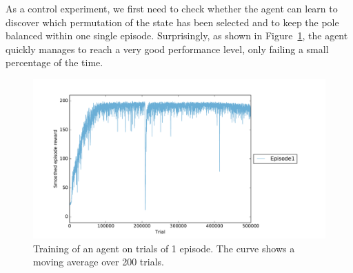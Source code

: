 \begin{table}
	\centering
	\caption{State permutations used for training and testing}
	\label{tab:20perms}
\end{table}

As a control experiment, we first need to check whether the agent can learn
to discover which permutation of the state has been selected and to keep the
pole balanced within one single episode. Surprisingly, as shown in 
Figure~\ref{fig:20perms1ep_training}, the agent quickly manages to reach
a very good performance level, only failing a small percentage of the time.\\

\begin{figure}[H]
	\centering
	\includegraphics[width=0.9\linewidth]{fig/20perms1ep_training.pdf}
	\caption{Training of an agent on trials of 1 episode. The curve
	shows a moving average over 200 trials.}
	\label{fig:20perms1ep_training}
\end{figure}

